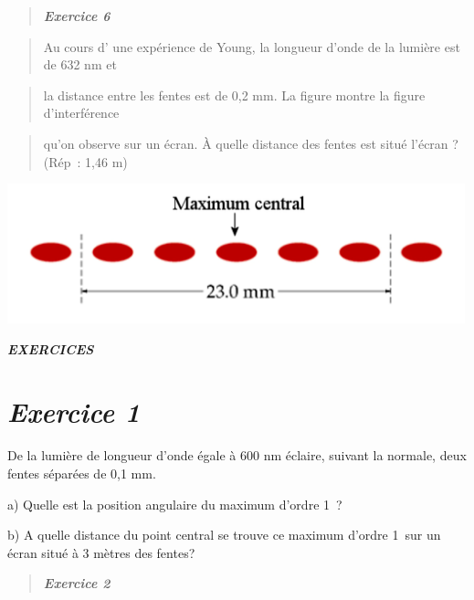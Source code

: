 \begin{quote}
\end{quote}

\begin{quote}
\emph{\textbf{Exercice 6}}
\end{quote}

\begin{quote}
Au cours d' une expérience de Young, la longueur d'onde de la lumière
est de 632 nm et
\end{quote}

\begin{quote}
la distance entre les fentes est de 0,2 mm. La figure montre la figure
d'interférence
\end{quote}

\begin{quote}
qu'on observe sur un écran. À quelle distance des fentes est situé
l'écran\textbf{ }? (Rép~: 1,46 m)
\end{quote}

\includegraphics[width=13.259cm,height=4.045cm]{Pictures/100000010000059F000001B75001F99348A6D888.png}

\emph{\textbf{EXERCICES}}

\hypertarget{exercice-1-1}{%
\section{\texorpdfstring{\emph{Exercice
1}}{Exercice 1}}\label{exercice-1-1}}

De la lumière de longueur d'onde égale à 600 nm éclaire, suivant la
normale, deux fentes séparées de 0,1 mm.

a) Quelle est la position angulaire du maximum d'ordre 1~?

b) A quelle distance du point central se trouve ce maximum d'ordre 1~sur
un écran situé à 3 mètres des fentes?

\begin{quote}
\emph{\textbf{Exercice 2}}
\end{quote}

\begin{quote}
\end{quote}

